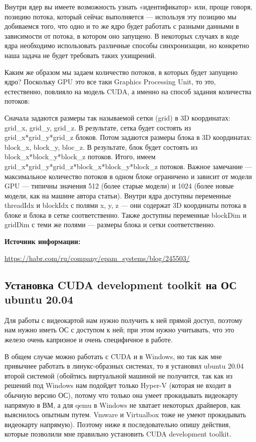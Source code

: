 \documentclass[12pt,a4paper]{scrartcl}
\begin{document}
Внутри ядер вы имеете возможность узнать «идентификатор» или, проще говоря, позицию потока, который сейчас выполняется — используя эту позицию мы добиваемся того, что одно и то же ядро будет работать с разными данными в зависимости от потока, в котором оно запущено. 
В некоторых случаях в коде ядра необходимо использовать различные способы синхронизации, но конкретно наша задача не будет требовать таких ухищрений.


Каким же образом мы задаем количество потоков, в которых будет запущено ядро? Поскольку GPU это все таки Graphics Processing Unit, то это, естественно, повлияло на модель CUDA, а именно на способ задания количества потоков:

Сначала задаются размеры так называемой сетки (grid) в 3D координатах: grid\_x, grid\_y, grid\_z. В результате, сетка будет состоять из grid\_x*grid\_y*grid\_z блоков.
Потом задаются размеры блока в 3D координатах: block\_x, block\_y, bloc\_z. В результате, блок будет состоять из block\_x*block\_y*block\_z потоков. Итого, имеем grid\_x*grid\_y*grid\_z*block\_x*block\_y*block\_z потоков. Важное замечание — максимальное количество потоков в одном блоке ограничено и зависит от модели GPU — типичны значения 512 (более старые модели) и 1024 (более новые модели, как на машине автора статьи).
Внутри ядра доступны переменные threadIdx и blockIdx с полями x, y, z — они содержат 3D координаты потока в блоке и блока в сетке соответственно. Также доступны переменные blockDim и gridDim с теми же полями — размеры блока и сетки соответственно.


\textbf{Источник информации:}

\href{https://habr.com/ru/company/epam_systems/blog/245503/}{https://habr.com/ru/company/epam\_systems/blog/245503/}



\subsection{Установка CUDA development toolkit на ОС ubuntu 20.04}

Для работы с видеокартой нам нужно получить к ней прямой доступ, поэтому нам нужно иметь ОС с доступом к ней; при этом нужно учитывать, что это железо очень капризное и очень специфичное в работе. 

В общем случае можно работать с CUDA и в Windows, но так как мне привычнее работать в линукс-образных системах, то я установил ubuntu 20.04 второй системой (обойтись виртуальной машиной не получится, так как из решений под Windows нам подойдет только Hyper-V (которая не входит в обычную версию ОС), потому что только она умеет прокидывать видеокарту напрямую в ВМ, а для qemu в Windows не хватает некоторых драйверов, как выяснилось опытным путем. Vmware и Virtualbox тоже не умеют прокидывать видеокарту напрямую). Поэтому ниже я последовательно опишу действия, которые позволили мне правильно установить CUDA development toolkit.
\end{document}
